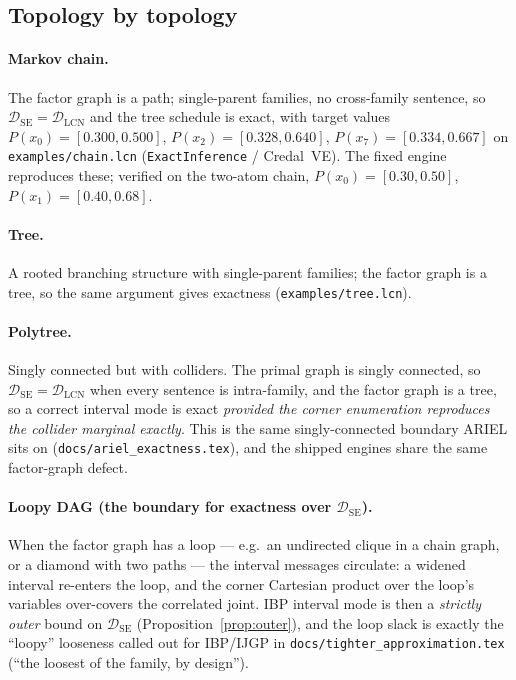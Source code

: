 \documentclass[11pt]{article}
\newcommand{\DSE}{\mathcal{D}_{\mathrm{SE}}}
\newcommand{\DLCN}{\mathcal{D}_{\mathrm{LCN}}}
\begin{document}
\subsection{Topology by topology}\label{sec:topo}

\paragraph{Markov chain.} The factor graph is a path; single-parent families, no cross-family
sentence, so $\DSE=\DLCN$ and the tree schedule is exact, with target values
$P(x_0)=[0.300,0.500]$, $P(x_2)=[0.328,0.640]$, $P(x_7)=[0.334,0.667]$ on \texttt{examples/chain.lcn}
(\texttt{ExactInference} / Credal~VE). The fixed engine reproduces these; verified on the two-atom
chain, $P(x_0){=}[0.30,0.50]$, $P(x_1){=}[0.40,0.68]$.

\paragraph{Tree.} A rooted branching structure with single-parent families; the factor graph is a
tree, so the same argument gives exactness (\texttt{examples/tree.lcn}).

\paragraph{Polytree.} Singly connected but with colliders. The primal graph is singly connected, so
$\DSE=\DLCN$ when every sentence is intra-family, and the factor graph is a tree, so a correct
interval mode is exact \emph{provided the corner enumeration reproduces the collider marginal
exactly}. This is the same singly-connected boundary ARIEL sits on
(\texttt{docs/ariel\_exactness.tex}), and the shipped engines share the same factor-graph defect.

\paragraph{Loopy DAG (the boundary for exactness over $\DSE$).} When the factor graph has a loop ---
e.g.\ an undirected clique in a chain graph, or a diamond with two paths --- the interval messages
circulate: a widened interval re-enters the loop, and the corner Cartesian product over the loop's
variables over-covers the correlated joint. IBP interval mode is then a \emph{strictly outer} bound
on $\DSE$ (Proposition~\ref{prop:outer}), and the loop slack is exactly the ``loopy'' looseness
called out for IBP/IJGP in \texttt{docs/tighter\_approximation.tex} (``the loosest of the family, by
design'').
\end{document}
